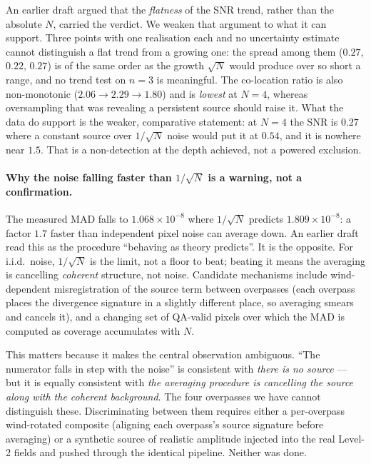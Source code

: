 \documentclass[11pt,a4paper]{article}
\begin{document}
An earlier draft argued that the \emph{flatness} of the SNR trend, rather than the absolute $N$,
carried the verdict. We weaken that argument to what it can support. Three points with one
realisation each and no uncertainty estimate cannot distinguish a flat trend from a growing one:
the spread among them ($0.27$, $0.22$, $0.27$) is of the same order as the growth $\sqrt{N}$
would produce over so short a range, and no trend test on $n=3$ is meaningful. The co-location
ratio is also non-monotonic ($2.06 \to 2.29 \to 1.80$) and is \emph{lowest} at $N{=}4$, whereas
oversampling that was revealing a persistent source should raise it. What the data do support is
the weaker, comparative statement: at $N{=}4$ the SNR is $0.27$ where a constant source over
$1/\sqrt{N}$ noise would put it at $0.54$, and it is nowhere near $1.5$. That is a non-detection
at the depth achieved, not a powered exclusion.

\paragraph{Why the noise falling faster than $1/\sqrt{N}$ is a warning, not a confirmation.} The
measured MAD falls to $1.068\times10^{-8}$ where $1/\sqrt{N}$ predicts $1.809\times10^{-8}$: a
factor $1.7$ faster than independent pixel noise can average down. An earlier draft read this as
the procedure ``behaving as theory predicts''. It is the opposite. For i.i.d.\ noise, $1/\sqrt{N}$
is the limit, not a floor to beat; beating it means the averaging is cancelling \emph{coherent}
structure, not noise. Candidate mechanisms include wind-dependent misregistration of the source
term between overpasses (each overpass places the divergence signature in a slightly different
place, so averaging smears and cancels it), and a changing set of QA-valid pixels over which the
MAD is computed as coverage accumulates with $N$.

This matters because it makes the central observation ambiguous. ``The numerator falls in step
with the noise'' is consistent with \emph{there is no source} --- but it is equally consistent
with \emph{the averaging procedure is cancelling the source along with the coherent background}.
The four overpasses we have cannot distinguish these. Discriminating between them requires either
a per-overpass wind-rotated composite (aligning each overpass's source signature before averaging)
or a synthetic source of realistic amplitude injected into the real Level-2 fields and pushed
through the identical pipeline. Neither was done.
\end{document}
